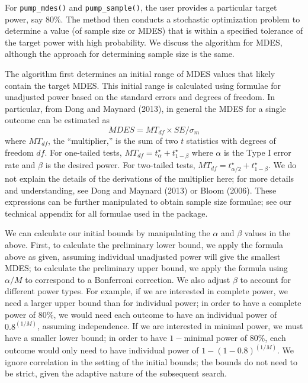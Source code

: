 \documentclass{article}
\begin{document}
For \texttt{pump\_mdes()} and \texttt{pump\_sample()}, the user provides
a particular target power, say \(80\%\). The method then conducts a
stochastic optimization problem to determine a value (of sample size or
MDES) that is within a specified tolerance of the target power with high
probability. We discuss the algorithm for MDES, although the approach
for determining sample size is the same.

The algorithm first determines an initial range of MDES values that
likely contain the target MDES. This initial range is calculated using
formulae for unadjusted power based on the standard errors and degrees
of freedom. In particular, from Dong and Maynard (2013), in general the
MDES for a single outcome can be estimated as
\[ MDES = MT_{df} \times SE / \sigma_{m} \] where \(MT_{df}\), the
``multiplier,'' is the sum of two \(t\) statistics with degrees of
freedom \(df\). For one-tailed tests,
\(MT_{df} = t_{\alpha}^\star + t_{1-\beta}^\star\) where \(\alpha\) is
the Type I error rate and \(\beta\) is the desired power. For two-tailed
tests, \(MT_{df} = t_{\alpha/2}^\star + t_{1-\beta}^\star\). We do not
explain the details of the derivations of the multiplier here; for more
details and understanding, see Dong and Maynard (2013) or Bloom (2006).
These expressions can be further manipulated to obtain sample size
formulae; see our technical appendix for all formulae used in the
package.

We can calculate our initial bounds by manipulating the \(\alpha\) and
\(\beta\) values in the above. First, to calculate the preliminary lower
bound, we apply the formula above as given, assuming individual
unadjusted power will give the smallest MDES; to calculate the
preliminary upper bound, we apply the formula using \(\alpha/M\) to
correspond to a Bonferroni correction. We also adjust \(\beta\) to
account for different power types. For example, if we are interested in
complete power, we need a larger upper bound than for individual power;
in order to have a complete power of \(80\%\), we would need each
outcome to have an individual power of \(\text{0.8}^{(1/M)}\), assuming
independence. If we are interested in minimal power, we must have a
smaller lower bound; in order to have \(1-\)minimal power of \(80\%\),
each outcome would only need to have individual power of
\(1 - (1 - \text{0.8})^{(1/M)}\). We ignore correlation in the setting
of the initial bounds; the bounds do not need to be strict, given the
adaptive nature of the subsequent search.
\end{document}
